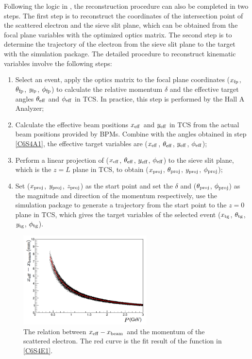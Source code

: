 Following the logic in , the reconstruction procedure can also be completed in two steps. The first step is to reconstruct the coordinates of the intersection point of the scattered electron and the sieve slit plane, which can be obtained from the focal plane variables with the optimized optics matrix. The second step is to determine the trajectory of the electron from the sieve slit plane to the target with the simulation package. The detailed procedure to reconstruct kinematic variables involve the following steps:
\begin{enumerate}[parsep=0pt]
\item \label{C6S4A1}Select an event, apply the optics matrix to the focal plane coordinates ($x_{\mathrm{fp}}$, $\theta_{\mathrm{fp}}$, $y_{\mathrm{fp}}$, $\phi_{\mathrm{fp}}$) to calculate the relative momentum $\delta$ and the effective target angles $\theta_{\mathrm{eff}}$ and $\phi_{\mathrm{eff}}$ in TCS. In practice, this step is performed by the Hall A Analyzer;
\item \label{C6S4A2}Calculate the effective beam positions $x_{\mathrm{eff}}$ and $y_{\mathrm{eff}}$ in TCS from the actual beam positions provided by BPMs. Combine with the angles obtained in step \ref{C6S4A1}, the effective target variables are ($x_{\mathrm{eff}}$, $\theta_{\mathrm{eff}}$, $y_{\mathrm{eff}}$, $\phi_{\mathrm{eff}}$);
\item Perform a linear projection of ($x_{\mathrm{eff}}$, $\theta_{\mathrm{eff}}$, $y_{\mathrm{eff}}$, $\phi_{\mathrm{eff}}$) to the sieve slit plane, which is the $z=L$ plane in TCS, to obtain ($x_{\mathrm{proj}}$, $\theta_{\mathrm{proj}}$, $y_{\mathrm{proj}}$, $\phi_{\mathrm{proj}}$);
\item Set ($x_{\mathrm{proj}}$, $y_{\mathrm{proj}}$, $z_{\mathrm{proj}}$) as the start point and set the $\delta$ and ($\theta_{\mathrm{proj}}$, $\phi_{\mathrm{proj}}$) as the magnitude and direction of the momentum respectively, use the simulation package to generate a trajectory from the start point to the $z=0$ plane in TCS, which gives the target variables of the selected event ($x_{\mathrm{tg}}$, $\theta_{\mathrm{tg}}$, $y_{\mathrm{tg}}$, $\phi_{\mathrm{tg}}$).
\end{enumerate}

\begin{figure}[b!]
  \centering
  \includegraphics[width=0.6\textwidth]{figs/effective-x-fit.png}
  \caption[Determine the effective beam position correction.]{The relation between $x_{\mathrm{eff}}-x_{\mathrm{beam}}$ and the momentum of the scattered electron. The red curve is the fit result of the function in \cref{C6S4E1}. \label{C6S4F2}}
\end{figure}

